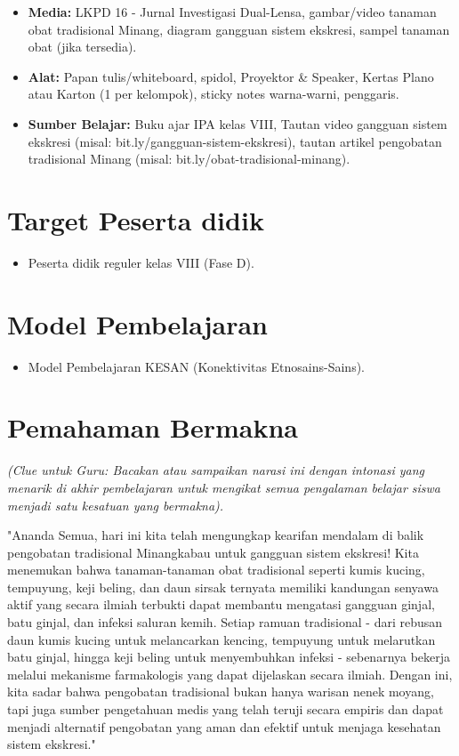 \documentclass[a4paper,12pt]{article}
\begin{document}
\begin{itemize}
\item \textbf{Media:} LKPD 16 - Jurnal Investigasi Dual-Lensa, gambar/video tanaman obat tradisional Minang, diagram gangguan sistem ekskresi, sampel tanaman obat (jika tersedia).
\item \textbf{Alat:} Papan tulis/whiteboard, spidol, Proyektor \& Speaker, Kertas Plano atau Karton (1 per kelompok), sticky notes warna-warni, penggaris.
\item \textbf{Sumber Belajar:} Buku ajar IPA kelas VIII, Tautan video gangguan sistem ekskresi (misal: bit.ly/gangguan-sistem-ekskresi), tautan artikel pengobatan tradisional Minang (misal: bit.ly/obat-tradisional-minang).
\end{itemize}

\section{Target Peserta didik}

\begin{itemize}
\item Peserta didik reguler kelas VIII (Fase D).
\end{itemize}

\section{Model Pembelajaran}

\begin{itemize}
\item Model Pembelajaran KESAN (Konektivitas Etnosains-Sains).
\end{itemize}

\section{Pemahaman Bermakna}
\textit{(Clue untuk Guru: Bacakan atau sampaikan narasi ini dengan intonasi yang menarik di akhir pembelajaran untuk mengikat semua pengalaman belajar siswa menjadi satu kesatuan yang bermakna).}

\begin{tcolorbox}[sectionbox]
"Ananda Semua, hari ini kita telah mengungkap kearifan mendalam di balik pengobatan tradisional Minangkabau untuk gangguan sistem ekskresi! Kita menemukan bahwa tanaman-tanaman obat tradisional seperti kumis kucing, tempuyung, keji beling, dan daun sirsak ternyata memiliki kandungan senyawa aktif yang secara ilmiah terbukti dapat membantu mengatasi gangguan ginjal, batu ginjal, dan infeksi saluran kemih. Setiap ramuan tradisional - dari rebusan daun kumis kucing untuk melancarkan kencing, tempuyung untuk melarutkan batu ginjal, hingga keji beling untuk menyembuhkan infeksi - sebenarnya bekerja melalui mekanisme farmakologis yang dapat dijelaskan secara ilmiah. Dengan ini, kita sadar bahwa pengobatan tradisional bukan hanya warisan nenek moyang, tapi juga sumber pengetahuan medis yang telah teruji secara empiris dan dapat menjadi alternatif pengobatan yang aman dan efektif untuk menjaga kesehatan sistem ekskresi."
\end{tcolorbox}
\end{document}
